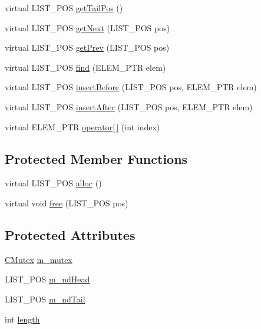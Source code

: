 \begin{DoxyCompactItemize}
\item 
virtual L\-I\-S\-T\-\_\-\-P\-O\-S \hyperlink{class_c_list_a8cfadd6c7dd3dd6688e314b732e7b48f}{get\-Tail\-Pos} ()
\item 
virtual L\-I\-S\-T\-\_\-\-P\-O\-S \hyperlink{class_c_list_a30c0314e7dc83d1ba735f673b09e4deb}{get\-Next} (L\-I\-S\-T\-\_\-\-P\-O\-S pos)
\item 
virtual L\-I\-S\-T\-\_\-\-P\-O\-S \hyperlink{class_c_list_a4cf8035d25af022ba9c054c1b4f5b61c}{get\-Prev} (L\-I\-S\-T\-\_\-\-P\-O\-S pos)
\item 
virtual L\-I\-S\-T\-\_\-\-P\-O\-S \hyperlink{class_c_list_ac10ff6ad96cb1a7aebb866d2a1cf62bf}{find} (E\-L\-E\-M\-\_\-\-P\-T\-R elem)
\item 
virtual L\-I\-S\-T\-\_\-\-P\-O\-S \hyperlink{class_c_list_a02ae0a29f9466904e349a984d287a756}{insert\-Before} (L\-I\-S\-T\-\_\-\-P\-O\-S pos, E\-L\-E\-M\-\_\-\-P\-T\-R elem)
\item 
virtual L\-I\-S\-T\-\_\-\-P\-O\-S \hyperlink{class_c_list_ac30a5a1368438fbcf58b13bf4f2f44ad}{insert\-After} (L\-I\-S\-T\-\_\-\-P\-O\-S pos, E\-L\-E\-M\-\_\-\-P\-T\-R elem)
\item 
virtual E\-L\-E\-M\-\_\-\-P\-T\-R \hyperlink{class_c_list_aab328a02021b5988496f2dbb631bd71c}{operator\mbox{[}$\,$\mbox{]}} (int index)
\end{DoxyCompactItemize}
\subsection*{Protected Member Functions}
\begin{DoxyCompactItemize}
\item 
virtual L\-I\-S\-T\-\_\-\-P\-O\-S \hyperlink{class_c_list_acdb91815d21dabe0572e67da9bfd4c27}{alloc} ()
\item 
virtual void \hyperlink{class_c_list_aff212aceabad23dbb4370273ac91d814}{free} (L\-I\-S\-T\-\_\-\-P\-O\-S pos)
\end{DoxyCompactItemize}
\subsection*{Protected Attributes}
\begin{DoxyCompactItemize}
\item 
\hyperlink{class_c_mutex}{C\-Mutex} \hyperlink{class_c_list_a76347b2a51428a724cc7698074e08639}{m\-\_\-mutex}
\item 
L\-I\-S\-T\-\_\-\-P\-O\-S \hyperlink{class_c_list_a3ffa4c25b7b0604451366791aede5af7}{m\-\_\-nd\-Head}
\item 
L\-I\-S\-T\-\_\-\-P\-O\-S \hyperlink{class_c_list_aeeb0d3cb327800216a8f0fa112efa8d6}{m\-\_\-nd\-Tail}
\item 
int \hyperlink{class_c_list_adb228ed98190b1f57080840440f2eb2b}{length}
\end{DoxyCompactItemize}


